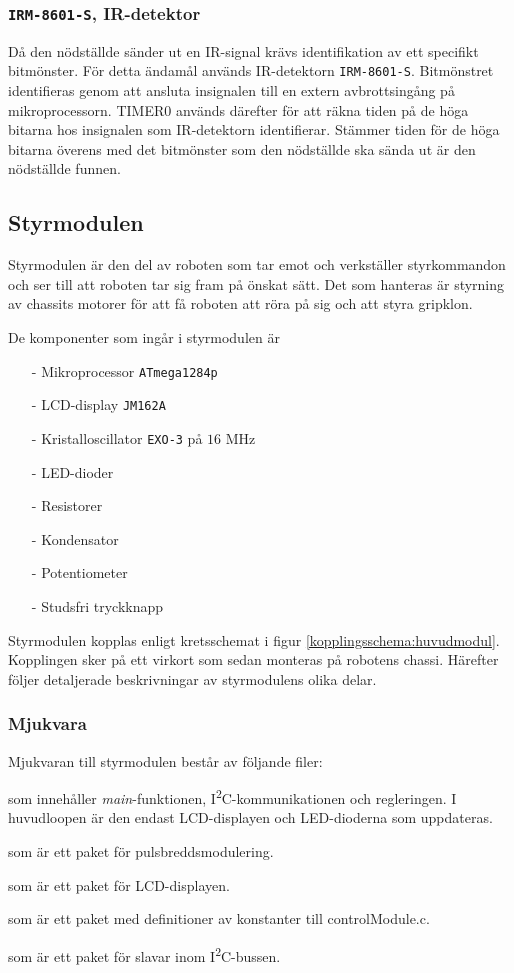 \documentclass[11pt]{article}
\begin{document}
\begin{flushleft}
\subsubsection{\texttt{IRM-8601-S}, IR-detektor}
Då den nödställde sänder ut en IR-signal krävs identifikation av ett specifikt bitmönster. För detta ändamål används IR-detektorn \verb+IRM-8601-S+. Bitmönstret identifieras genom att ansluta insignalen till en extern avbrottsingång på mikroprocessorn. TIMER0 används därefter för att räkna tiden på de höga bitarna hos insignalen som IR-detektorn identifierar. Stämmer tiden för de höga bitarna överens med det bitmönster som den nödställde ska sända ut är den nödställde funnen.

\subsection{Styrmodulen}

Styrmodulen är den del av roboten som tar emot och verkställer styrkommandon och ser till att roboten tar sig fram på önskat sätt. Det som hanteras är styrning av chassits motorer för att få roboten att röra på sig och att styra gripklon. 

De komponenter som ingår i styrmodulen är
\begin{itemize}
\item[-] Mikroprocessor \verb+ATmega1284p+
\item[-] LCD-display \verb+JM162A+
\item[-] Kristalloscillator \verb+EXO-3+ på $16$ MHz
\item[-] LED-dioder
\item[-] Resistorer
\item[-] Kondensator
\item[-] Potentiometer
\item[-] Studsfri tryckknapp
\end{itemize}

Styrmodulen kopplas enligt kretsschemat i figur \ref{kopplingsschema:huvudmodul}. Kopplingen sker på ett virkort som sedan monteras på robotens chassi. Härefter följer detaljerade beskrivningar av styrmodulens olika delar.

\subsubsection{Mjukvara}
Mjukvaran till styrmodulen består av följande filer:
\begin{description}[style=unboxed, leftmargin=0cm]
\item[controlModule.c] som innehåller \textit{main}-funktionen, I\textsuperscript{2}C-kommunikationen och regleringen. I huvudloopen är den endast LCD-displayen och LED-dioderna som uppdateras.
\item[PWM.h] som är ett paket för pulsbreddsmodulering.
\item[LCD.h] som är ett paket för LCD-displayen.
\item[constants.h] som är ett paket med definitioner av konstanter till controlModule.c.
\item[I2C\_slave.h] som är ett paket för slavar inom I\textsuperscript{2}C-bussen.


\end{description}
\end{flushleft}
\end{document}
